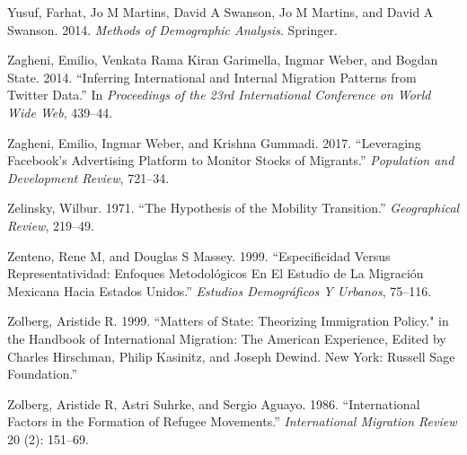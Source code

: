 \documentclass[
]{article}
\begin{document}
\leavevmode\hypertarget{ref-yusuf2014methods}{}%
Yusuf, Farhat, Jo M Martins, David A Swanson, Jo M Martins, and David A
Swanson. 2014. \emph{Methods of Demographic Analysis}. Springer.

\leavevmode\hypertarget{ref-zagheni2014inferring}{}%
Zagheni, Emilio, Venkata Rama Kiran Garimella, Ingmar Weber, and Bogdan
State. 2014. ``Inferring International and Internal Migration Patterns
from Twitter Data.'' In \emph{Proceedings of the 23rd International
Conference on World Wide Web}, 439--44.

\leavevmode\hypertarget{ref-zagheni2017leveraging}{}%
Zagheni, Emilio, Ingmar Weber, and Krishna Gummadi. 2017. ``Leveraging
Facebook's Advertising Platform to Monitor Stocks of Migrants.''
\emph{Population and Development Review}, 721--34.

\leavevmode\hypertarget{ref-zelinsky1971hypothesis}{}%
Zelinsky, Wilbur. 1971. ``The Hypothesis of the Mobility Transition.''
\emph{Geographical Review}, 219--49.

\leavevmode\hypertarget{ref-zenteno1999especificidad}{}%
Zenteno, Rene M, and Douglas S Massey. 1999. ``Especificidad Versus
Representatividad: Enfoques Metodológicos En El Estudio de La Migración
Mexicana Hacia Estados Unidos.'' \emph{Estudios Demográficos Y Urbanos},
75--116.

\leavevmode\hypertarget{ref-zolberg1999matters}{}%
Zolberg, Aristide R. 1999. ``Matters of State: Theorizing Immigration
Policy." in the Handbook of International Migration: The American
Experience, Edited by Charles Hirschman, Philip Kasinitz, and Joseph
Dewind. New York: Russell Sage Foundation.''

\leavevmode\hypertarget{ref-zolberg1986international}{}%
Zolberg, Aristide R, Astri Suhrke, and Sergio Aguayo. 1986.
``International Factors in the Formation of Refugee Movements.''
\emph{International Migration Review} 20 (2): 151--69.
\end{document}
